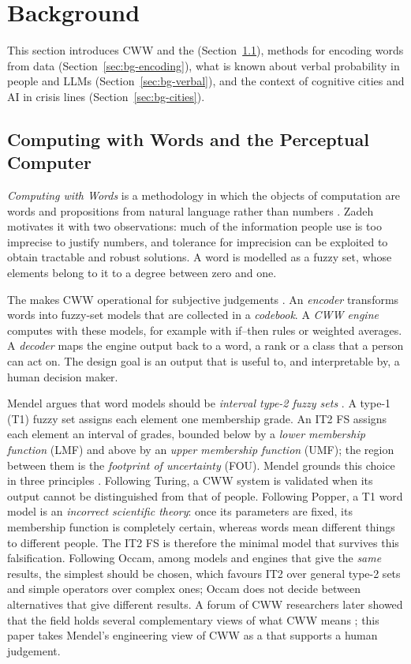 \section{Background}
\label{sec:background}

This section introduces CWW and the \Perc{} (Section~\ref{sec:bg-cww}), methods for encoding words from data
(Section~\ref{sec:bg-encoding}), what is known about verbal probability in people and LLMs
(Section~\ref{sec:bg-verbal}), and the context of cognitive cities and AI in crisis lines (Section~\ref{sec:bg-cities}).

\subsection{Computing with Words and the Perceptual Computer}
\label{sec:bg-cww}

\emph{Computing with Words} is a methodology in which the objects of computation are words and propositions from
natural language rather than numbers \citep{zadeh1996fuzzy}.
Zadeh motivates it with two observations: much of the information people use is too imprecise to justify numbers, and
tolerance for imprecision can be exploited to obtain tractable and robust solutions.
A word is modelled as a fuzzy set, whose elements belong to it to a degree between zero and one.

The \emph{\Perc{}} makes CWW operational for subjective judgements \citep{mendel2001perceptual,mendel2010perceptual}.
An \emph{encoder} transforms words into fuzzy-set models that are collected in a \emph{codebook}.
A \emph{CWW engine} computes with these models, for example with if--then rules or weighted averages.
A \emph{decoder} maps the engine output back to a word, a rank or a class that a person can act on.
The design goal is an output that is useful to, and interpretable by, a human decision maker.

Mendel argues that word models should be \emph{interval type-2 fuzzy sets} \citep{mendel2007computing}.
A type-1 (T1) fuzzy set assigns each element one membership grade.
An IT2 FS assigns each element an interval of grades, bounded below by a \emph{lower membership function} (LMF) and above
by an \emph{upper membership function} (UMF); the region between them is the \emph{footprint of uncertainty} (FOU).
Mendel grounds this choice in three principles \citep{mendel2007computing}.
Following Turing, a CWW system is validated when its output cannot be distinguished from that of people.
Following Popper, a T1 word model is an \emph{incorrect scientific theory}: once its parameters are fixed, its membership
function is completely certain, whereas words mean different things to different people.
The IT2 FS is therefore the minimal model that survives this falsification.
Following Occam, among models and engines that give the \emph{same} results, the simplest should be chosen, which
favours IT2 over general type-2 sets and simple operators over complex ones; Occam does not decide between alternatives
that give different results.
A forum of CWW researchers later showed that the field holds several complementary views of what CWW means
\citep{mendel2010means}; this paper takes Mendel's engineering view of CWW as a \Perc{} that supports a human judgement.


